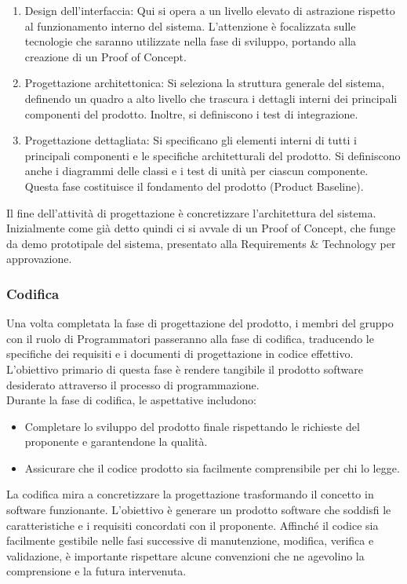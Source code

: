 \documentclass{article}
\begin{document}
\begin{enumerate}
    \item Design dell'interfaccia: Qui si opera a un livello elevato di astrazione rispetto al funzionamento interno del sistema. L'attenzione è focalizzata sulle tecnologie che saranno utilizzate nella fase di sviluppo, portando alla creazione di un Proof of Concept.
    \item Progettazione architettonica: Si seleziona la struttura generale del sistema, definendo un quadro a alto livello che trascura i dettagli interni dei principali componenti del prodotto. Inoltre, si definiscono i test di integrazione.
    \item Progettazione dettagliata: Si specificano gli elementi interni di tutti i principali componenti e le specifiche architetturali del prodotto. Si definiscono anche i diagrammi delle classi e i test di unità per ciascun componente. Questa fase costituisce il fondamento del prodotto (Product Baseline).
\end{enumerate}
Il fine dell'attività di progettazione è concretizzare l'architettura del sistema. Inizialmente come già detto quindi ci si avvale di un Proof of Concept, che funge da demo prototipale del sistema, presentato alla Requirements \& Technology per approvazione.

\subsubsection{Codifica}
Una volta completata la fase di progettazione del prodotto, i membri del gruppo con il ruolo di Programmatori passeranno alla fase di codifica, traducendo le specifiche dei requisiti e i documenti di progettazione in codice effettivo. L'obiettivo primario di questa fase è rendere tangibile il prodotto software desiderato attraverso il processo di programmazione.\\
Durante la fase di codifica, le aspettative includono:
\begin{itemize}
    \item Completare lo sviluppo del prodotto finale rispettando le richieste del proponente e garantendone la qualità.
    \item Assicurare che il codice prodotto sia facilmente comprensibile per chi lo legge.
\end{itemize}
La codifica mira a concretizzare la progettazione trasformando il concetto in software funzionante. L'obiettivo è generare un prodotto software che soddisfi le caratteristiche e i requisiti concordati con il proponente. Affinché il codice sia facilmente gestibile nelle fasi successive di manutenzione, modifica, verifica e validazione, è importante rispettare alcune convenzioni che ne agevolino la comprensione e la futura intervenuta.
\end{document}
